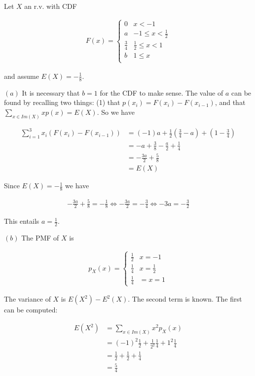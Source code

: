 \documentclass[a4paper, 12pt]{article}
\begin{document}
\pagebreak 

Let $X$ an r.v. with CDF

\begin{align*}
    F(x) = \begin{cases}
        0 & x < -1 \\
        a & -1 \leq x < \frac{1}{2} \\
        \frac{3}{4} & \frac{1}{2} \leq x < 1\\
        b & 1 \leq x \\
    \end{cases}
\end{align*}

and assume $E(X) = -\frac{1}{8}$.


$(a)$ It is necessary that $b = 1$ for the CDF to make sense. The value of 
$a$ can be found by recalling two things: (1) that $p(x_i) = F(x_i) - F(x_{i-1})$,
and that $\sum_{x \in Im(X)} x p(x) = E(X)$. So we have 

\begin{align*}
    \sum_{i = 1}^{3} x_i \left( F(x_i) - F(x_{i-1}) \right) &= (-1)a + \frac{1}{2} \left( \frac{3}{4} - a \right) + \left( 1 - \frac{3}{4} \right) \\ 
                                                            &= -a + \frac{3}{8} -\frac{a}{2} + \frac{1}{4} \\ 
                                                            &= - \frac{3a}{2} + \frac{5}{8} \\ 
                                                            &= E(X)
\end{align*}

Since $E(X) = -\frac{1}{8}$ we have 

\begin{align*}
    - \frac{3a}{2} + \frac{5}{8} = -\frac{1}{8} \iff -\frac{3a}{2} = -\frac{3}{4} \iff -3a = -\frac{3}{2}
\end{align*}

This entails $a = \frac{1}{2}$.

$(b)$ The PMF of $X$ is 

\begin{align*}
    p_X(x) = \begin{cases}
        \frac{1}{2} & x = -1 \\ 
        \frac{1}{4} & x = \frac{1}{2} \\ 
        \frac{1}{4} &= x = 1
    \end{cases}
\end{align*}

The variance of $X$ is $E(X^2) - E^2(X)$. The second term is known. The first can be computed:

\begin{align*}
    E(X^2) &= \sum_{x \in Im(X)} x^2 p_X(x) \\ 
           &= (-1)^2 \frac{1}{2} + \frac{1}{2^2} \frac{1}{4} + 1^2 \frac{1}{4} \\ 
           &=\frac{1}{2} + \frac{1}{2} + \frac{1}{4} \\ 
           &=\frac{5}{4}
\end{align*}
\end{document}
